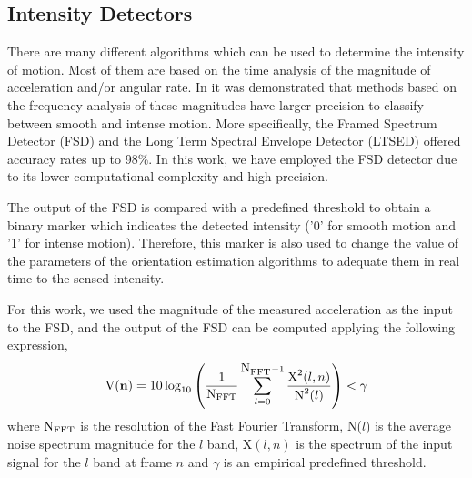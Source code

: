 \documentclass{IOS-Book-Article}
\begin{document}
\subsection{Intensity Detectors}
\label{subsec:intensity_detectors}
\indent \indent There are many different algorithms which can be used to determine the intensity of motion. Most of them are based on the time analysis of the magnitude of acceleration and/or angular rate. In \cite{olivares_detection_2012} it was demonstrated that methods based on the frequency analysis of these magnitudes have larger precision to classify between smooth and intense motion. More specifically, the Framed Spectrum Detector (FSD) and the Long Term Spectral Envelope Detector (LTSED) offered accuracy rates up to 98\%. In this work, we have employed the FSD detector due to its lower computational complexity and high precision.  

The output of the FSD is compared with a predefined threshold to obtain a binary marker which indicates the detected intensity ('0' for smooth motion and '1' for intense motion). Therefore, this marker is also used to change the value of the parameters of the orientation estimation algorithms to adequate them in real time to the sensed intensity. 

For this work, we used the magnitude of the measured acceleration as the input to the FSD, and the output of the FSD can be computed applying the following expression,
\begin{equation}
\mbox{V}(\mathbf{n})=10\log_{10}\left(\frac{1}{\mbox{N}_{\scriptsize \mbox{FFT}}}\sum_{l=0}^{\mbox{N}_{\scriptsize \mbox{FFT}}-1}\frac{\mbox{X}^{2}(l,n)}{\mbox{N}^{2}(l)}\right)<\gamma
\label{eq:fsd}
\end{equation}
where $\mbox{N}_{\scriptsize \mbox{FFT}}$ is the resolution of the Fast Fourier Transform, N($l$) is the average noise spectrum magnitude for the $l$ band, $\mbox{X}(l,n)$ is the spectrum of the input signal for the  $l$ band at frame $n$ and $\gamma$ is an empirical predefined threshold. 
\end{document}
